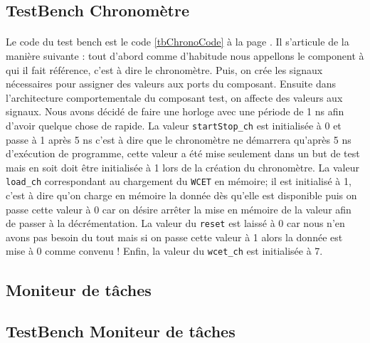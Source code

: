\documentclass[a4paper,12pt]{report}
\begin{document}
			
		\subsection{TestBench Chronomètre}
			\paragraph*{}
			Le code du test bench est le code \ref{tbChronoCode} à la page \pageref{tbChronoCode}. Il s'articule de la manière suivante : tout d'abord comme d'habitude nous appellons le component à qui il fait référence, c'est à dire le chronomètre. Puis, on crée les signaux nécessaires pour assigner des valeurs aux ports du composant. Ensuite dans l'architecture comportementale du composant test, on affecte des valeurs aux signaux. Nous avons décidé de faire une horloge avec une période de 1 ns afin d'avoir quelque chose de rapide. La valeur \texttt{startStop\_ch} est initialisée à 0 et passe à 1 après 5 ns c'est à dire que le chronomètre ne démarrera qu'après 5 ns d'exécution de programme, cette valeur a été mise seulement dans un but de test mais en soit doit être initialisée à 1 lors de la création du chronomètre. La valeur \texttt{load\_ch} correspondant au chargement du \texttt{WCET} en mémoire; il est initialisé à 1, c'est à dire qu'on charge en mémoire la donnée dès qu'elle est disponible puis on passe cette valeur à 0 car on désire arrêter la mise en mémoire de la valeur afin de passer à la décrémentation. La valeur du \texttt{reset} est laissé à 0 car nous n'en avons pas besoin du tout mais si on passe cette valeur à 1 alors la donnée est mise à 0 comme convenu ! Enfin, la valeur du \texttt{wcet\_ch} est initialisée à 7.
			
		\subsection{Moniteur de tâches}
			\paragraph*{}
	
	
		\subsection{TestBench Moniteur de tâches}
			\paragraph*{}
			
\end{document}
